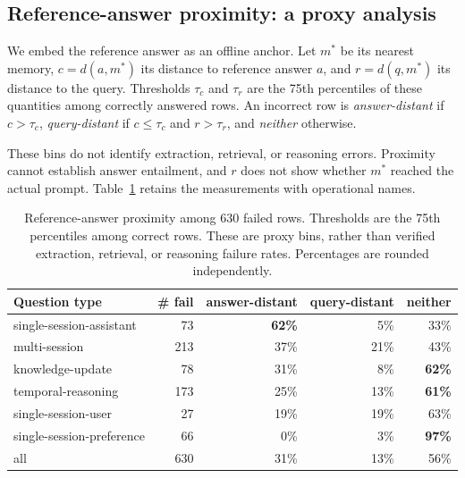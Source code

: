 \documentclass{article}
\begin{document}
\subsection{Reference-answer proximity: a proxy analysis}
\label{sec:decompose}

We embed the reference answer as an offline anchor.
Let $m^*$ be its nearest memory, $c=d(a,m^*)$ its distance to reference answer $a$,
and $r=d(q,m^*)$ its distance to the query.
Thresholds $\tau_c$ and $\tau_r$ are the 75th percentiles of these quantities
among correctly answered rows.
An incorrect row is \emph{answer-distant} if $c>\tau_c$,
\emph{query-distant} if $c\leq\tau_c$ and $r>\tau_r$, and
\emph{neither} otherwise.

These bins do not identify extraction, retrieval, or reasoning errors.
Proximity cannot establish answer entailment, and $r$ does not show
whether $m^*$ reached the actual prompt.
Table~\ref{tab:decompose} retains the measurements with operational names.

\begin{table}[h]
  \centering\small
  \caption{Reference-answer proximity among 630 failed rows.
  Thresholds are the 75th percentiles among correct rows.
  These are proxy bins, rather than verified extraction, retrieval, or
  reasoning failure rates. Percentages are rounded independently.}
  \label{tab:decompose}
  \begin{tabular}{lrrrr}
    \toprule
    Question type & \# fail & answer-distant & query-distant & neither \\
    \midrule
    single-session-assistant  & \phantom{0}73 & \textbf{62\%} & \phantom{0}5\% & 33\% \\
    multi-session             & 213 & 37\% & 21\% & 43\% \\
    knowledge-update          & \phantom{0}78 & 31\% & \phantom{0}8\% & \textbf{62\%} \\
    temporal-reasoning        & 173 & 25\% & 13\% & \textbf{61\%} \\
    single-session-user       & \phantom{0}27 & 19\% & 19\% & 63\% \\
    single-session-preference & \phantom{0}66 & \phantom{0}0\% & \phantom{0}3\% & \textbf{97\%} \\
    \midrule
    all                       & 630 & 31\% & 13\% & 56\% \\
    \bottomrule
  \end{tabular}
\end{table}
\end{document}
